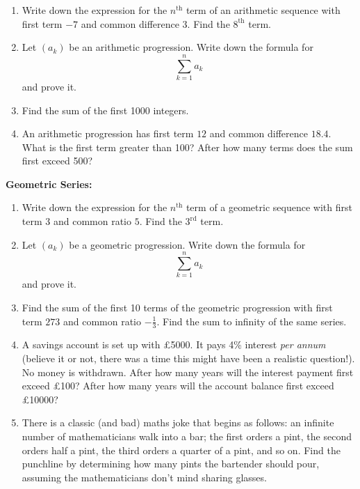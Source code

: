 \documentclass{article}
\begin{document}
\begin{enumerate}
	\item Write down the expression for the $n^\mathrm{th}$ term of an arithmetic sequence with first term $-7$ and common difference $3$. Find the $8^\mathrm{th}$ term.
	\item Let $(a_k)$ be an arithmetic progression. Write down the formula for
		\[\sum_{k=1}^n a_k\]
		and prove it.
	\item Find the sum of the first 1000 integers.
	\item An arithmetic progression has first term $12$ and common difference $18.4$. What is the first term greater than 100? After how many terms does the sum first exceed 500?
\end{enumerate}



\clearpage



\textbf{Geometric Series:}\bigskip


\begin{enumerate}
	\item Write down the expression for the $n^\mathrm{th}$ term of a geometric sequence with first term $3$ and common ratio $5$. Find the $3^\mathrm{rd}$ term.
	\item Let $(a_k)$ be a geometric progression. Write down the formula for
		\[\sum_{k=1}^n a_k\]
		and prove it.
	\item Find the sum of the first 10 terms of the geometric progression with first term $273$ and common ratio $-\frac{1}{3}$. Find the sum to infinity of the same series.
	\item A savings account is set up with \pounds5000. It pays 4\% interest \textit{per annum} (believe it or not, there was a time this might have been a realistic question!). No money is withdrawn. After how many years will the interest payment first exceed \pounds100? After how many years will the account balance first exceed \pounds10000?
	\item There is a classic (and bad) maths joke that begins as follows: an infinite number of mathematicians walk into a bar; the first orders a pint, the second orders half a pint, the third orders a quarter of a pint, and so on. Find the punchline by determining how many pints the bartender should pour, assuming the mathematicians don't mind sharing glasses.
\end{enumerate}
\end{document}
